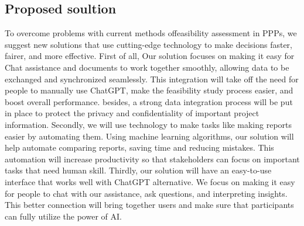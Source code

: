 \subsection{Proposed soultion}
To overcome problems with current methods offeasibility assessment in PPPs, we suggest new solutions that use cutting-edge technology to make decisions faster, fairer, and more effective.
\vskip 0.5cm
First of all, Our solution focuses on making it easy for Chat assistance and documents to work together smoothly, allowing data to be exchanged and synchronized seamlessly. This integration will take off the need for people to manually use ChatGPT, make the feasibility study process easier, and boost overall performance. besides, a strong data integration process will be put in place to protect the privacy and confidentiality of important project information.
\vskip 0.5cm
Secondly, we will use technology to make tasks like making reports easier by automating them. Using machine learning algorithms, our solution will help automate comparing reports, saving time and reducing mistakes. This automation will increase productivity so that stakeholders can focus on important tasks that need human skill.
\vskip 0.5cm
Thirdly, our solution will have an easy-to-use interface that works well with ChatGPT alternative. We focus on making it easy for people to chat with our assistance, ask questions, and interpreting insights. This better connection will bring together users and make sure that participants can fully utilize the power of AI.
